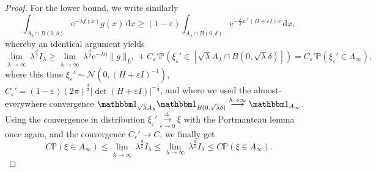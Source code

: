 \documentclass[10pt]{article}
\newcommand{\cL}{\mathcal{L}}
\renewcommand{\d}{\mathrm{d}}
\newcommand{\e}{\mathrm{e}}
\renewcommand{\P}{\mathbb{P}}
\newcommand{\R}{\mathbb{R}}
\newcommand{\1}{\mathbbm 1}
\newtheorem{theorem}{Theorem}
\begin{document}
\begin{proof}
        For the lower bound, we write similarly
        \[\int_{A_\lambda \cap B(0,\delta)} \e^{-\lambda f(x)}g(x)\,\d x\geq (1-\varepsilon)\int_{A_\lambda \cap B(0,\delta)}\e^{-\frac\lambda2x^\intercal(H+\varepsilon I)x}\,\d x,\]
        whereby an identical argument yields
        \[ \underset{\lambda\to\infty}{\underline\lim}\,\lambda^{\frac d2}I_\lambda \geq \underset{\lambda\to\infty}{\underline\lim}\,\lambda^{\frac d2}\e^{-\lambda\eta}\|g\|_{L^1} + C_\varepsilon'\P\left(\xi_\varepsilon' \in \left[\sqrt\lambda A_\lambda \cap B(0,\sqrt\lambda\delta)\right]\right)= C_\varepsilon'\P(\xi_\varepsilon'\in A_\infty),\]
        where this time $\xi_\varepsilon' \sim \mathcal N(0,(H+\varepsilon I)^{-1})$, $ C_\varepsilon ' = (1-\varepsilon) (2\pi)^{\frac d2} |\det (H+\varepsilon I)|^{-\frac 12}$, and where we used the almost-everywhere convergence $\mathbbm 1_{\sqrt \lambda A_\lambda} \mathbbm 1_{B(0,\sqrt \lambda \delta)} \overset{\lambda\to \infty}{\longrightarrow} \mathbbm 1_{A_\infty}$.
        Using the convergence in distribution $\xi_\varepsilon' \overset{\cL}{\underset{\varepsilon\to 0}{\longrightarrow}}\xi$ with the Portmanteau lemma once again, and the convergence $C_\varepsilon'\to C$, we finally get
        \[C \P(\xi\in A_\infty) \leq \underset{\lambda\to\infty}{\underline\lim}\,\lambda^{\frac d2}I_\lambda\leq \underset{\lambda\to\infty}{\overline\lim}\,\lambda^{\frac d2}I_\lambda \leq C \P(\xi\in A_\infty).\]
    \end{proof}


        

\end{document}
